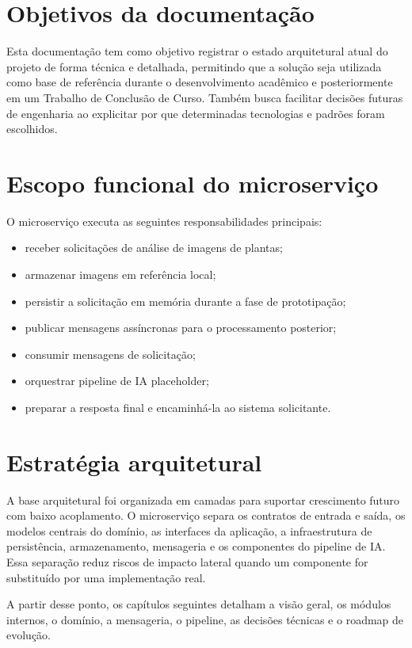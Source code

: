 \section{Objetivos da documentação}

Esta documentação tem como objetivo registrar o estado arquitetural atual do projeto de forma técnica e detalhada, permitindo que a solução seja utilizada como base de referência durante o desenvolvimento acadêmico e posteriormente em um Trabalho de Conclusão de Curso. Também busca facilitar decisões futuras de engenharia ao explicitar por que determinadas tecnologias e padrões foram escolhidos.

\section{Escopo funcional do microserviço}

O microserviço executa as seguintes responsabilidades principais:
\begin{itemize}
    \item receber solicitações de análise de imagens de plantas;
    \item armazenar imagens em referência local;
    \item persistir a solicitação em memória durante a fase de prototipação;
    \item publicar mensagens assíncronas para o processamento posterior;
    \item consumir mensagens de solicitação;
    \item orquestrar pipeline de IA placeholder;
    \item preparar a resposta final e encaminhá-la ao sistema solicitante.
\end{itemize}

\section{Estratégia arquitetural}

A base arquitetural foi organizada em camadas para suportar crescimento futuro com baixo acoplamento. O microserviço separa os contratos de entrada e saída, os modelos centrais do domínio, as interfaces da aplicação, a infraestrutura de persistência, armazenamento, mensageria e os componentes do pipeline de IA. Essa separação reduz riscos de impacto lateral quando um componente for substituído por uma implementação real.

A partir desse ponto, os capítulos seguintes detalham a visão geral, os módulos internos, o domínio, a mensageria, o pipeline, as decisões técnicas e o roadmap de evolução.
